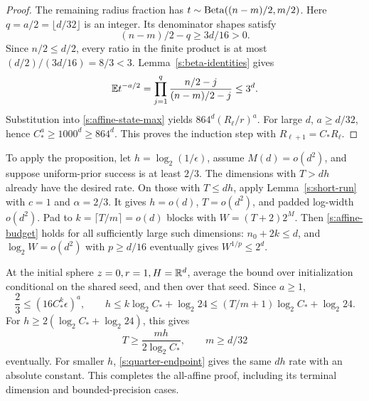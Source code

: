 \begin{proof}
The remaining radius fraction has
\(t\sim\operatorname{Beta}((n-m)/2,m/2)\). Here \(q=a/2=\lfloor d/32\rfloor\)
is an integer. Its denominator shapes satisfy
\[
 (n-m)/2-q\ge3d/16>0.
\]
Since \(n/2\le d/2\), every ratio in the finite product is at most
\((d/2)/(3d/16)=8/3<3\). Lemma~\ref{s:beta-identities} gives
\begin{equation}\label{s:affine-beta}
 \mathbb E t^{-a/2}
 =\prod_{j=1}^{q}\frac{n/2-j}{(n-m)/2-j}\le3^d.
\end{equation}
Substitution into \eqref{s:affine-state-max} yields
\(864^d(R_\ell/r)^a\). For large \(d\), \(a\ge d/32\), hence
\(C_*^a\ge1000^d\ge864^d\). This proves the induction step with
\(R_{\ell+1}=C_*R_\ell\).
\end{proof}

To apply the proposition, let \(h=\log_2(1/\epsilon)\), assume
\(M(d)=o(d^2)\), and suppose uniform-prior success is at least \(2/3\).
The dimensions with \(T>dh\) already have the desired rate. On those
with \(T\le dh\), apply Lemma~\ref{s:short-run} with
\(c=1\) and \(\alpha=2/3\). It gives \(h=o(d)\),
\(T=o(d^2)\), and padded log-width \(o(d^2)\).
Pad to \(k=\lceil T/m\rceil=o(d)\) blocks with
\(W=(T+2)2^M\). Then \eqref{s:affine-budget} holds for all
sufficiently large such dimensions: \(n_0+2k\le d\), and
\(\log_2 W=o(d^2)\) with \(p\ge d/16\) eventually gives
\(W^{1/p}\le2^d\).

At the initial sphere \(z=0,r=1,H=\mathbb R^d\), average the bound over
initialization conditional on the shared seed, and then over that
seed. Since \(a\ge1\),
\begin{equation}\label{s:affine-endgame}
 \frac23\le(16C_*^k\epsilon)^a,\qquad
 h\le k\log_2C_*+\log_2 24
 \le(T/m+1)\log_2C_*+\log_2 24.
\end{equation}
For \(h\ge2(\log_2C_*+\log_2 24)\), this gives
\[
 T\ge \frac{mh}{2\log_2C_*},\qquad m\ge d/32
\]
eventually. For smaller \(h\), \eqref{s:quarter-endpoint} gives
the same \(d h\) rate with an absolute constant. This completes the
all-affine proof, including its terminal dimension and
bounded-precision cases.
